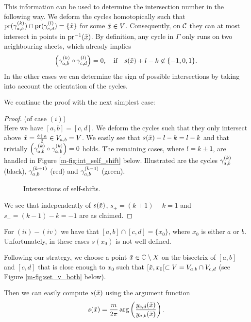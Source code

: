 \documentclass[main.tex]{subfiles}
\begin{document}
 This information can be used to determine the intersection number in the following way. We deform the cycles homotopically
 such that $\operatorname{pr}(\gamma_{a,b}^{(k)}) \cap \operatorname{pr}(\gamma_{c,d}^{(l)}) = \{ \tilde{x} \}$ for some $\tilde{x} \in V$. Consequently, on $\mathcal{C}$ they can at most intersect in
 points in $\operatorname{pr}^{-1}(\tilde{x})$. By definition, any cycle in $\Gamma$ only runs on two neighbouring sheets, which already implies
 \begin{equation}
   \left(\gamma_{a,b}^{(k)} \circ \gamma_{c,d}^{(l)}\right) = 0, \quad \text{if} \quad  s(\tilde{x})+l-k \not\in \{-1,0,1\}.
 \end{equation}
  In the other cases we can determine the
  sign of possible intersections by taking into account the orientation of the cycles.
  
 We continue the proof with the next simplest case:
 \begin{proof}\let\qed\relax (of case $(i)$) \\
 Here we have $[a,b] = [c,d]$. We deform the cycles such that they only intersect above
 $\tilde{x} = \frac{b+a}{2} \in  V_{a,b}= V$.
 We easily see that $s(\tilde{x}) + l - k = l - k$ and that trivially $\left( \gamma_{a,b}^{(k)} \circ \gamma_{a,b}^{(k)} \right) = 0$ holds. The remaining cases,
 where $l = k \pm 1$, are handled in Figure \ref{m-fig:int_self_shift} below.
   Illustrated are the cycles $\gamma_{a,b}^{(k)}$ (black),
      $\gamma_{a,b}^{(k+1)}$ (red) and $\gamma_{a,b}^{(k-1)}$ (green).
    \begin{figure}[H]
      \begin{center}
   
      \end{center}
    \caption{Intersections of self-shifts.}
    \label{fig:int_self_shift}
\end{figure}
  We see that independently of $s(\tilde{x})$, $s_+ = (k+1)-k = 1$ and $s_- = (k-1)-k = -1$ are as claimed.
 \end{proof}

  For $(ii)-(iv)$ we have that $[a,b] \cap [c,d] = \{ x_0 \}$, where $x_0$ is either $a$ or $b$. Unfortunately, in these cases $s(x_0)$ is not
  well-defined.
  
 Following our strategy, we choose a point $\tilde{x} \in \mathbb{C} \setminus X$ on the bisectrix of
  $[a,b]$ and $[c,d]$ that is close enough to $x_0$ such that $[\tilde{x},x_0[ \subset V = V_{a,b} \cap V_{c,d}$
  (see Figure \ref{m-fig:set_v_both} below).
  
  Then we can easily compute $s(\tilde{x})$ using the argument function
  \begin{equation}\label{eq:sxt}
   s(\tilde{x}) = \frac{m}{2\pi} \arg \left( \frac{y_{c,d}(\tilde{x})}{y_{a,b}(\tilde{x})} \right).
  \end{equation}
  
\end{document}
